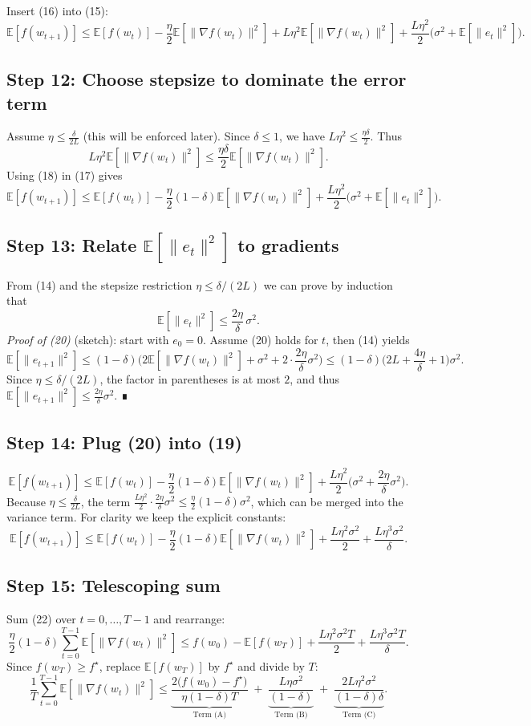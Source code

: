 \documentclass{article}
\newcommand{\E}{\mathbb{E}}
\begin{document}
Insert (16) into (15):
\[
\E[f(w_{t+1})]
\le \E[f(w_t)]
   -\frac{\eta}{2}\E[\|\nabla f(w_t)\|^2]
   +L\eta^2\E[\|\nabla f(w_t)\|^2]
   +\frac{L\eta^2}{2}\big(\sigma^2+\E[\|e_t\|^2]\big) .
\tag{17}
\]

\subsection*{Step 12: Choose stepsize to dominate the error term}
Assume $\eta\le \frac{\delta}{2L}$ (this will be enforced later).  
Since $\delta\le 1$, we have $L\eta^2\le \frac{\eta\delta}{2}$.  
Thus
\[
L\eta^2\E[\|\nabla f(w_t)\|^2]
\le \frac{\eta\delta}{2}\E[\|\nabla f(w_t)\|^2] .
\tag{18}
\]
Using (18) in (17) gives
\[
\E[f(w_{t+1})]
\le \E[f(w_t)]
   -\frac{\eta}{2}(1-\delta)\E[\|\nabla f(w_t)\|^2]
   +\frac{L\eta^2}{2}\big(\sigma^2+\E[\|e_t\|^2]\big) .
\tag{19}
\]

\subsection*{Step 13: Relate $\E[\|e_t\|^2]$ to gradients}
From (14) and the stepsize restriction $\eta\le \delta/(2L)$ we can prove by induction that
\[
\E[\|e_t\|^2]\le \frac{2\eta}{\delta}\,\sigma^2 .
\tag{20}
\]
\emph{Proof of (20)} (sketch): start with $e_0=0$. Assume (20) holds for $t$, then (14) yields
\[
\E[\|e_{t+1}\|^2]\le (1-\delta)\big(2\E[\|\nabla f(w_t)\|^2]+\sigma^2+2\cdot\frac{2\eta}{\delta}\sigma^2\big)
\le (1-\delta)\big(2L\!+\! \frac{4\eta}{\delta}+1\big)\sigma^2 .
\]
Since $\eta\le\delta/(2L)$, the factor in parentheses is at most $2$, and thus $\E[\|e_{t+1}\|^2]\le\frac{2\eta}{\delta}\sigma^2$. ∎

\subsection*{Step 14: Plug (20) into (19)}
\[
\E[f(w_{t+1})]
\le \E[f(w_t)]
   -\frac{\eta}{2}(1-\delta)\E[\|\nabla f(w_t)\|^2]
   +\frac{L\eta^2}{2}\Big(\sigma^2+\frac{2\eta}{\delta}\sigma^2\Big) .
\tag{21}
\]
Because $\eta\le\frac{\delta}{2L}$, the term $\frac{L\eta^2}{2}\cdot\frac{2\eta}{\delta}\sigma^2\le\frac{\eta}{2}(1-\delta)\sigma^2$, which can be merged into the variance term. For clarity we keep the explicit constants:
\[
\E[f(w_{t+1})]
\le \E[f(w_t)]
   -\frac{\eta}{2}(1-\delta)\E[\|\nabla f(w_t)\|^2]
   +\frac{L\eta^2\sigma^2}{2}
   +\frac{L\eta^3\sigma^2}{\delta} .
\tag{22}
\]

\subsection*{Step 15: Telescoping sum}
Sum (22) over $t=0,\dots,T-1$ and rearrange:
\[
\frac{\eta}{2}(1-\delta)\sum_{t=0}^{T-1}\E[\|\nabla f(w_t)\|^2]
\le f(w_0)-\E[f(w_T)]
   +\frac{L\eta^2\sigma^2 T}{2}
   +\frac{L\eta^3\sigma^2 T}{\delta} .
\tag{23}
\]
Since $f(w_T)\ge f^\star$, replace $\E[f(w_T)]$ by $f^\star$ and divide by $T$:
\[
\frac{1}{T}\sum_{t=0}^{T-1}\E[\|\nabla f(w_t)\|^2]
\le
\underbrace{\frac{2\big(f(w_0)-f^\star\big)}{\eta(1-\delta)T}}_{\text{Term (A)}}
\;+\;
\underbrace{\frac{L\eta\sigma^2}{(1-\delta)}}_{\text{Term (B)}}
\;+\;
\underbrace{\frac{2L\eta^2\sigma^2}{(1-\delta)\delta}}_{\text{Term (C)}} .
\tag{24}
\]
\end{document}

